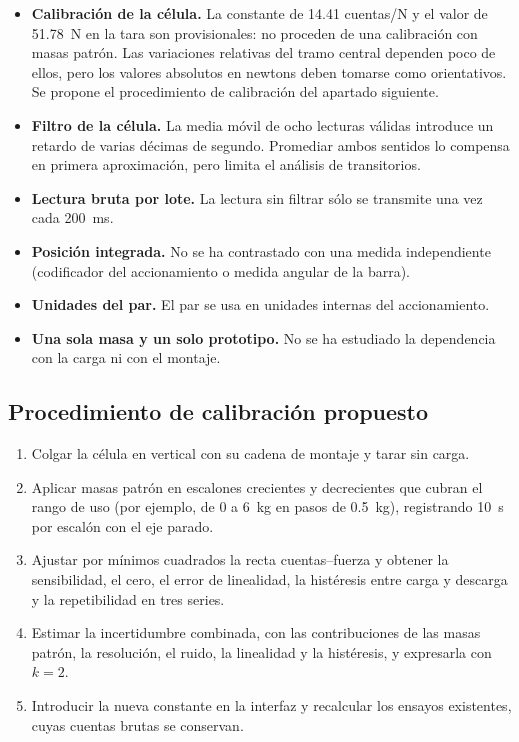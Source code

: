 \begin{itemize}
  \item \textbf{Calibración de la célula.} La constante de \num{14.41} cuentas/N y el valor de
        \SI{51.78}{\newton} en la tara son provisionales: no proceden de una calibración con masas
        patrón. Las variaciones relativas del tramo central dependen poco de ellos, pero los valores
        absolutos en newtons deben tomarse como orientativos. Se propone el procedimiento de
        calibración del apartado siguiente.
  \item \textbf{Filtro de la célula.} La media móvil de ocho lecturas válidas introduce un retardo de
        varias décimas de segundo. Promediar ambos sentidos lo compensa en primera aproximación, pero
        limita el análisis de transitorios.
  \item \textbf{Lectura bruta por lote.} La lectura sin filtrar sólo se transmite una vez cada
        \SI{200}{\milli\second}.
  \item \textbf{Posición integrada.} No se ha contrastado con una medida independiente (codificador
        del accionamiento o medida angular de la barra).
  \item \textbf{Unidades del par.} El par se usa en unidades internas del accionamiento.
  \item \textbf{Una sola masa y un solo prototipo.} No se ha estudiado la dependencia con la carga
        ni con el montaje.
\end{itemize}

\subsection{Procedimiento de calibración propuesto}

\begin{enumerate}
  \item Colgar la célula en vertical con su cadena de montaje y tarar sin carga.
  \item Aplicar masas patrón en escalones crecientes y decrecientes que cubran el rango de uso (por
        ejemplo, de \num{0} a \SI{6}{\kilo\gram} en pasos de \SI{0.5}{\kilo\gram}), registrando
        \SI{10}{\second} por escalón con el eje parado.
  \item Ajustar por mínimos cuadrados la recta cuentas--fuerza y obtener la sensibilidad, el cero,
        el error de linealidad, la histéresis entre carga y descarga y la repetibilidad en tres
        series.
  \item Estimar la incertidumbre combinada, con las contribuciones de las masas patrón, la
        resolución, el ruido, la linealidad y la histéresis, y expresarla con $k=2$.
  \item Introducir la nueva constante en la interfaz y recalcular los ensayos existentes, cuyas
        cuentas brutas se conservan.
\end{enumerate}
